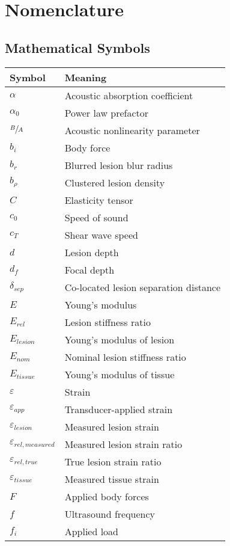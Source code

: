 \chapter*{Nomenclature}
	\section*{Mathematical Symbols}
		\begin{longtable}[l]{ll}
			Symbol & Meaning \\
			\hline \endhead
			$\alpha$ & Acoustic absorption coefficient \\
			$\alpha_0$ & Power law prefactor \\
			$\sfrac{B}{A}$ & Acoustic nonlinearity parameter \\
			$b_i$ & Body force \\
			$b_r$ & Blurred lesion blur radius \\
			$b_\rho$ & Clustered lesion density \\
			$C$ & Elasticity tensor \\
			$c_0$ & Speed of sound \\
			$c_T$ & Shear wave speed \\
			$d$ & Lesion depth \\
			$d_f$ & Focal depth \\
			$\delta_{sep}$ & Co-located lesion separation distance \\
			$E$ & Young's modulus \\
			$E_{rel}$ & Lesion stiffness ratio \\
			$E_{lesion}$ & Young's modulus of lesion \\
			$E_{nom}$ & Nominal lesion stiffness ratio \\
			$E_{tissue}$ & Young's modulus of tissue \\
			$\varepsilon$ & Strain \\
			$\varepsilon_{app}$ & Transducer-applied strain \\
			$\varepsilon_{lesion}$ & Measured lesion strain \\
			$\varepsilon_{rel,measured}$ & Measured lesion strain ratio \\
			$\varepsilon_{rel,true}$ & True lesion strain ratio \\
			$\varepsilon_{tissue}$ & Measured tissue strain \\
			$F$ & Applied body forces \\
			$f$ & Ultrasound frequency \\
			$f_i$ & Applied load \\

\end{longtable}
